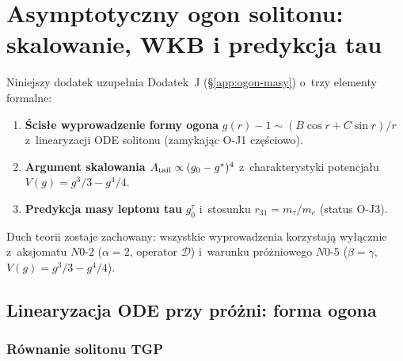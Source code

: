 \section{Asymptotyczny ogon solitonu: skalowanie, WKB i predykcja tau}%
\label{app:wkb-atail}

Niniejszy dodatek uzupełnia Dodatek~J (\S\ref{app:ogon-masy})
o~trzy elementy formalne:
\begin{enumerate}[nosep]
  \item \textbf{Ścisłe wyprowadzenie formy ogona} $g(r)-1 \sim (B\cos r + C\sin r)/r$
        z~linearyzacji ODE solitonu (zamykając O-J1 częściowo).
  \item \textbf{Argument skalowania $A_{\rm tail} \propto (g_0-g^*)^4$}
        z~charakterystyki potencjału $V(g) = g^3/3-g^4/4$.
  \item \textbf{Predykcja masy leptonu tau} $g_0^\tau$ i~stosunku
        $r_{31} = m_\tau/m_e$ (status O-J3).
\end{enumerate}

Duch teorii zostaje zachowany: wszystkie wyprowadzenia korzystają wyłącznie
z~aksjomatu $N0$-2 ($\alpha=2$, operator $\mathcal{D}$) i~warunku próżniowego
$N0$-5 ($\beta=\gamma$, $V(g) = g^3/3 - g^4/4$).

\medskip
\noindent{}
\medskip

\subsection{Linearyzacja ODE przy próżni: forma ogona}%
\label{app:K-linearyzacja}

\subsubsection{Równanie solitonu TGP}

